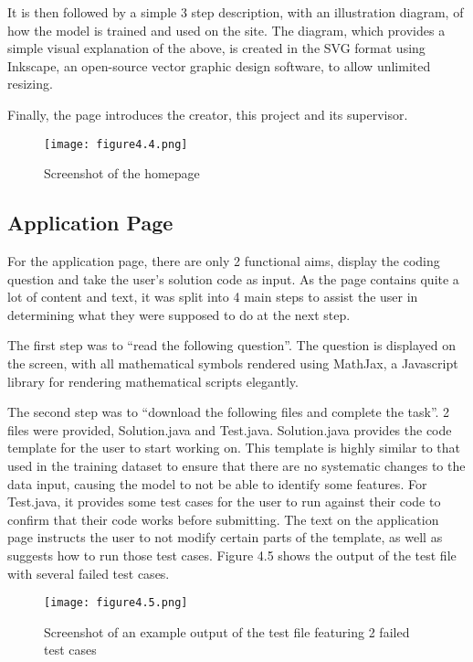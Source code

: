 \documentclass{report}
\begin{document}
It is then followed by a simple 3 step description, with an illustration diagram, of how the model is trained and used on the site. The diagram, which provides a simple visual explanation of the above, is created in the SVG format using Inkscape, an open-source vector graphic design software,  to allow unlimited resizing.

Finally, the page introduces the creator, this project and its supervisor.

\begin{figure}[h!]
\centering
\texttt{[image: figure4.4.png]}
\caption{Screenshot of the homepage}
\end{figure}

\subsection{Application Page}

For the application page, there are only 2 functional aims, display the coding question and take the user’s solution code as input. As the page contains quite a lot of content and text, it was split into 4 main steps to assist the user in determining what they were supposed to do at the next step.

The first step was to “read the following question”. The question is displayed on the screen, with all mathematical symbols rendered using MathJax, a Javascript library for rendering mathematical scripts elegantly.

The second step was to “download the following files and complete the task”. 2 files were provided, Solution.java and Test.java. Solution.java provides the code template for the user to start working on. This template is highly similar to that used in the training dataset to ensure that there are no systematic changes to the data input, causing the model to not be able to identify some features. For Test.java, it provides some test cases for the user to run against their code to confirm that their code works before submitting. The text on the application page instructs the user to not modify certain parts of the template, as well as suggests how to run those test cases. Figure 4.5 shows the output of the test file with several failed test cases.

\begin{figure}[h!]
\centering
\texttt{[image: figure4.5.png]}
\caption{Screenshot of an example output of the test file featuring 2 failed test cases}
\end{figure}
\end{document}
